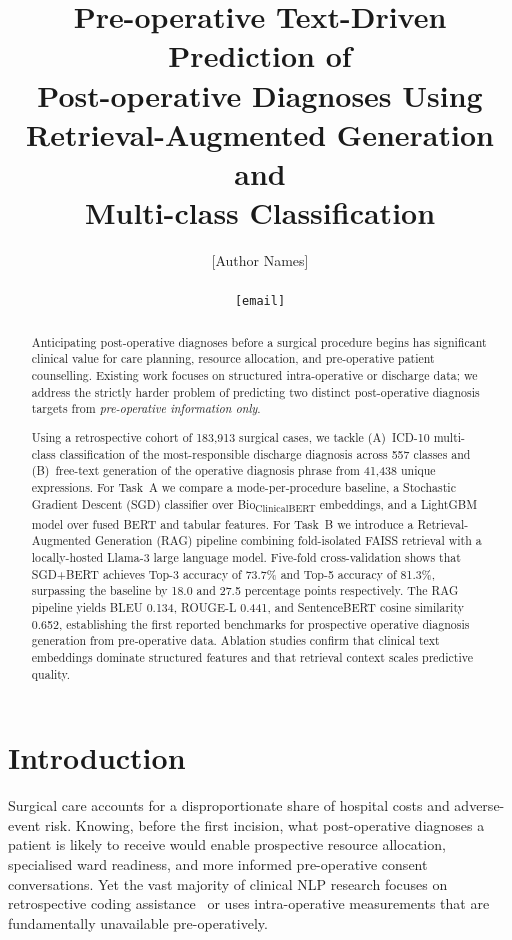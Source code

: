 \documentclass[10pt,twocolumn]{article}
\title{\textbf{Pre-operative Text-Driven Prediction of\\
Post-operative Diagnoses Using\\
Retrieval-Augmented Generation and\\
Multi-class Classification}}
\author{
  [Author Names]\\
  [Affiliation]\\
  \texttt{[email]}
}
\date{}
\begin{document}
\maketitle

\begin{abstract}
Anticipating post-operative diagnoses before a surgical procedure begins has significant clinical value for care planning, resource allocation, and pre-operative patient counselling. Existing work focuses on structured intra-operative or discharge data; we address the strictly harder problem of predicting two distinct post-operative diagnosis targets from \emph{pre-operative information only}.

Using a retrospective cohort of 183,913 surgical cases, we tackle (A)~ICD-10 multi-class classification of the most-responsible discharge diagnosis across 557 classes and (B)~free-text generation of the operative diagnosis phrase from 41,438 unique expressions. For Task~A we compare a mode-per-procedure baseline, a Stochastic Gradient Descent (SGD) classifier over Bio\textsubscript{ClinicalBERT} embeddings, and a LightGBM model over fused BERT and tabular features. For Task~B we introduce a Retrieval-Augmented Generation (RAG) pipeline combining fold-isolated FAISS retrieval with a locally-hosted Llama-3 large language model. Five-fold cross-validation shows that SGD+BERT achieves Top-3 accuracy of 73.7\% and Top-5 accuracy of 81.3\%, surpassing the baseline by 18.0 and 27.5 percentage points respectively. The RAG pipeline yields BLEU 0.134, ROUGE-L 0.441, and SentenceBERT cosine similarity 0.652, establishing the first reported benchmarks for prospective operative diagnosis generation from pre-operative data. Ablation studies confirm that clinical text embeddings dominate structured features and that retrieval context scales predictive quality.
\end{abstract}

\section{Introduction}
\label{sec:intro}

Surgical care accounts for a disproportionate share of hospital costs and adverse-event risk. Knowing, before the first incision, what post-operative diagnoses a patient is likely to receive would enable prospective resource allocation, specialised ward readiness, and more informed pre-operative consent conversations. Yet the vast majority of clinical NLP research focuses on retrospective coding assistance~\cite{mullenbach2018explainable,huang2022plm} or uses intra-operative measurements that are fundamentally unavailable pre-operatively.
\end{document}
